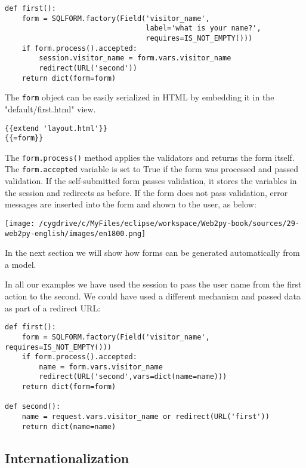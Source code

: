 \documentclass[justified,sixbynine,notoc]{tufte-book}
\def\ft{\small\tt}
\begin{document}
\begin{fullwidth}
\begin{lstlisting}
def first():
    form = SQLFORM.factory(Field('visitor_name',
                                 label='what is your name?',
                                 requires=IS_NOT_EMPTY()))
    if form.process().accepted:
        session.visitor_name = form.vars.visitor_name
        redirect(URL('second'))
    return dict(form=form)
\end{lstlisting}

The {\ft form} object can be easily serialized in HTML by embedding it in the "default/first.html" view.
\begin{lstlisting}[keywords={}]
{{extend 'layout.html'}}
{{=form}}
\end{lstlisting}

The {\ft form.process()} method applies the validators and returns the form itself. The {\ft form.accepted} variable is set to True if the form was processed and passed validation. If the self-submitted form passes validation, it stores the variables in the session and redirects as before. If the form does not pass validation, error messages are inserted into the form and shown to the user, as below:


\goodbreak\begin{center}\texttt{[image: /cygdrive/c/MyFiles/eclipse/workspace/Web2py-book/sources/29-web2py-english/images/en1800.png]}\end{center}


In the next section we will show how forms can be generated automatically from a model.

In all our examples we have used the session to pass the user name from the first action to the second. We could have used a different mechanism and passed data as part of a redirect URL:

\begin{lstlisting}
def first():
    form = SQLFORM.factory(Field('visitor_name', requires=IS_NOT_EMPTY()))
    if form.process().accepted:
        name = form.vars.visitor_name
        redirect(URL('second',vars=dict(name=name)))
    return dict(form=form)

def second():
    name = request.vars.visitor_name or redirect(URL('first'))
    return dict(name=name)
\end{lstlisting}

\goodbreak\subsection{Internationalization}


\end{fullwidth}
\end{document}
